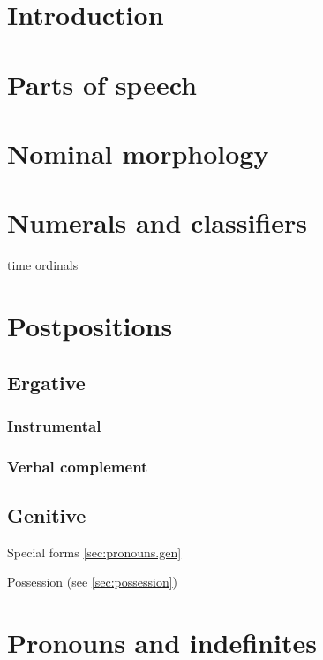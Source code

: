 \documentclass[oldfontcommands,oneside,a4paper,11pt]{memoir}
\begin{document}
\linenumbers

\chapter{Introduction}

 
\chapter{Parts of speech}
\chapter{Nominal morphology}
 

\chapter{Numerals and classifiers}
 


time ordinals
\chapter{Postpositions} \label{chapt:postpositions}


\section{Ergative} \label{sec:erg}
 
\subsection{Instrumental}






\subsection{Verbal complement}
 
\section{Genitive} \label{sec:genitive}

Special forms \ref{sec:pronouns.gen}

Possession (see \ref{sec:possession})
 
\chapter{Pronouns and indefinites}
\end{document}
